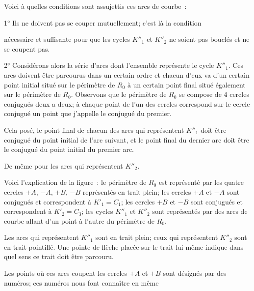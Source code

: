 \documentclass{article}
\begin{document}
Voici à quelles conditions sont assujettis ces arcs de courbe~:

1° Ils ne doivent pas se couper mutuellement; c'est là la condition

nécessaire et suffisante pour que les cycles $K''_{1}$ et $K''_{2}$ ne soient pas bouclés et ne se coupent pas.

2° Considérons alors la série d'arcs dont l'ensemble représente le cycle $K''_{1}$. Ces arcs doivent être parcourus dans un certain ordre et chacun d'eux va d'un certain point initial situé sur le périmètre de $R_{0}$ à un certain point final situé également sur le périmètre de $R_{0}$. Observons que le périmètre de $R_{0}$ se compose de 4 cercles conjugués deux a deux; à chaque point de l'un des cercles correspond sur le cercle conjugué un point que j'appelle le conjugué du premier.

Cela posé, le point final de chacun des arcs qui représentent $K''_{1}$ doit être conjugué du point initial de l'arc suivant, et le point final du dernier arc doit être le conjugué du point initial du premier arc.

De même pour les arcs qui représentent $K''_{2}$.


Voici l'explication de la figure~: le périmètre de $R_{0}$ est représenté par les quatre cercles $+A$, $-A$, $+B$, $-B$ représentés en trait plein; les cercles $+A$ et $-A$ sont conjugués et correspondent à $K'_{1} = C_{1}$; les cercles $+B$ et $-B$ sont conjugués et correspondent à $K'_{2} = C_{3}$; les cycles $K''_{1}$ et $K''_{2}$ sont représentés par des arcs de courbe allant d'un point à l'autre du périmètre de $R_{0}$.

Les arcs qui représentent $K''_{1}$ sont en trait plein; ceux qui représentent $K''_{2}$ sont en trait pointillé. Une pointe de flèche placée sur le trait lui-même indique dans quel sens ce trait doit être parcouru.

Les points où ces arcs coupent les cercles $\pm A$ et $\pm B$ sont désignés par des numéros; ces numéros nous font connaître en même
\end{document}
